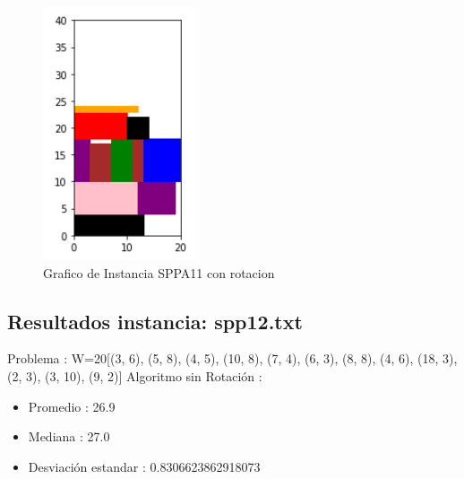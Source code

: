 \documentclass[10pt]{article}
\begin{document}
\begin{figure}[H]
\centerline{\includegraphics[width=0.5\linewidth]{4_con_rotar.jpg}}
\caption{Grafico de Instancia SPPA11 con rotacion}
\label{fig_8}
\end{figure} 



\subsection{Resultados instancia: spp12.txt}%
\label{subsec:Resultadosinstanciaspp12.txt}%
Problema : W=20{[}(3, 6), (5, 8), (4, 5), (10, 8), (7, 4), (6, 3), (8, 8), (4, 6), (18, 3), (2, 3), (3, 10), (9, 2){]} \newline%
%
 Algoritmo sin Rotación : %
\begin{itemize}%
\item%
Promedio : 26.9%
\item%
Mediana : 27.0%
\item%
Desviación estandar : 0.8306623862918073%
\end{itemize}
\end{document}
